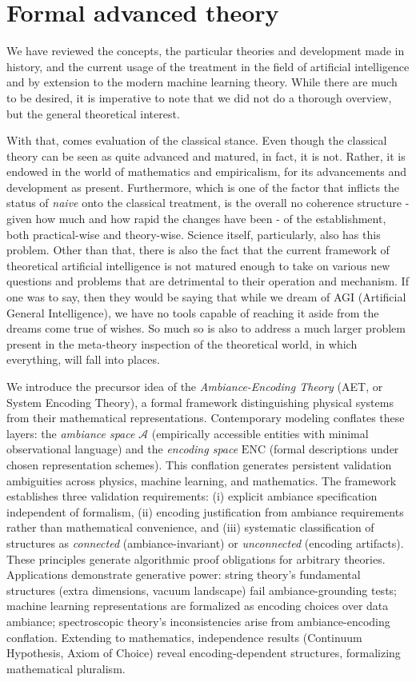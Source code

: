 \chapter{Formal advanced theory}

We have reviewed the concepts, the particular theories and development made in history, and the current usage of the treatment in the field of artificial intelligence and by extension to the modern machine learning theory. While there are much to be desired, it is imperative to note that we did not do a thorough overview, but the general theoretical interest. 

With that, comes evaluation of the classical stance. Even though the classical theory can be seen as quite advanced and matured, in fact, it is not. Rather, it is endowed in the world of mathematics and empiricalism, for its advancements and development as present. Furthermore, which is one of the factor that inflicts the status of \textit{naive} onto the classical treatment, is the overall no coherence structure - given how much and how rapid the changes have been - of the establishment, both practical-wise and theory-wise. Science itself, particularly, also has this problem. Other than that, there is also the fact that the current framework of theoretical artificial intelligence is not matured enough to take on various new questions and problems that are detrimental to their operation and mechanism. If one was to say, then they would be saying that while we dream of AGI (Artificial General Intelligence), we have no tools capable of reaching it aside from the dreams come true of wishes. So much so is also to address a much larger problem present in the meta-theory inspection of the theoretical world, in which everything, will fall into places. 

We introduce the precursor idea of the \textit{Ambiance-Encoding Theory} (AET, or System Encoding Theory), a formal framework distinguishing physical systems from their mathematical representations. Contemporary modeling conflates these layers: the \textit{ambiance space} $\mathcal{A}$ (empirically accessible entities with minimal observational language) and the \textit{encoding space} $\mathrm{ENC}$ (formal descriptions under chosen representation schemes). This conflation generates persistent validation ambiguities across physics, machine learning, and mathematics.
The framework establishes three validation requirements: (i) explicit ambiance specification independent of formalism, (ii) encoding justification from ambiance requirements rather than mathematical convenience, and (iii) systematic classification of structures as \textit{connected} (ambiance-invariant) or \textit{unconnected} (encoding artifacts). These principles generate algorithmic proof obligations for arbitrary theories.
Applications demonstrate generative power: string theory's fundamental structures (extra dimensions, vacuum landscape) fail ambiance-grounding tests; machine learning representations are formalized as encoding choices over data ambiance; spectroscopic theory's inconsistencies arise from ambiance-encoding conflation. Extending to mathematics, independence results (Continuum Hypothesis, Axiom of Choice) reveal encoding-dependent structures, formalizing mathematical pluralism.

